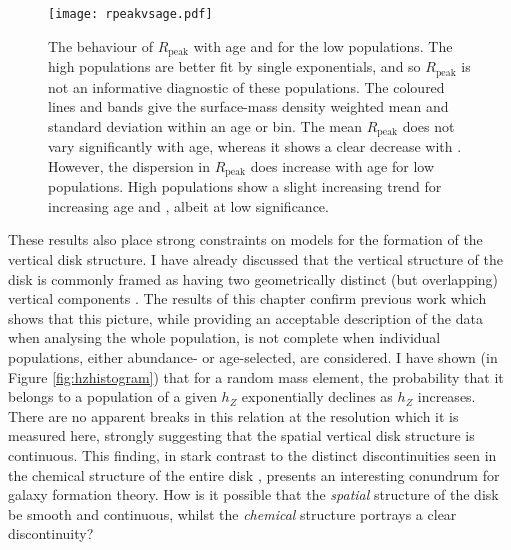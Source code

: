 \begin{figure}
	\texttt{[image: rpeakvsage.pdf]}
	\centering
   \caption[Peak radius of surface density profiles in the low \afe{} mono-age, mono-\feh{} populations in APOGEE DR12, shown as a function of age and \feh{}]{The behaviour of $R_{\mathrm{peak}}$ with age and \feh{} for the low \afe{} populations. The high \afe{} populations are better fit by single exponentials, and so $R_{\mathrm{peak}}$ is not an informative diagnostic of these populations. The coloured lines and bands give the surface-mass density weighted mean and standard deviation within an age or \feh{} bin. The mean $R_{\mathrm{peak}}$ does not vary significantly with age, whereas it shows a clear decrease with \feh{}. However, the dispersion in $R_{\mathrm{peak}}$ does increase with age for low \afe{} populations. High \afe{} populations show a slight increasing trend for increasing age and \feh{}, albeit at low significance. }
    \label{fig:rpeakvsage}
 \end{figure}


These results also place strong constraints on models for the formation of the vertical disk structure. I have already discussed that the vertical structure of the disk is commonly framed as having two geometrically distinct (but overlapping) vertical components \citep[e.g.][]{1983MNRAS.202.1025G}. The results of this chapter confirm previous work \citep[e.g.][]{2012ApJ...751..131B} which shows that this picture, while providing an acceptable description of the data when analysing the whole population, is not complete when individual populations, either abundance- or age-selected, are considered. I have shown (in Figure \ref{fig:hzhistogram}) that for a random mass element, the probability that it belongs to a population of a given $h_Z$ exponentially declines as $h_Z$ increases. There are no apparent breaks in this relation at the resolution which it is measured here, strongly suggesting that the spatial vertical disk structure is continuous. This finding, in stark contrast to the distinct discontinuities seen in the chemical structure of the entire disk \citep[e.g][]{2014ApJ...796...38N,2015ApJ...808..132H}, presents an interesting conundrum for galaxy formation theory. How is it possible that the \emph{spatial} structure of the disk be smooth and continuous, whilst the \emph{chemical} structure portrays a clear discontinuity?

